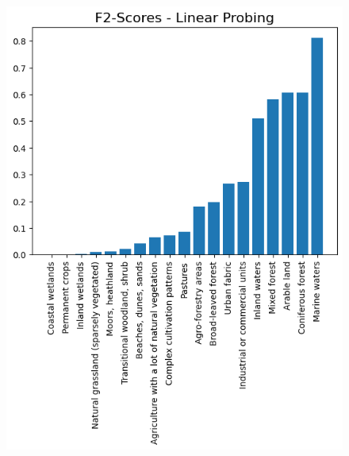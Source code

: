 \begin{figure}[h]
  \centering
  \begin{minipage}[b]{0.49\columnwidth}
    \centering
    \includegraphics[width=\columnwidth]{images/Linear Probing - f2 scores.png}
  \end{minipage}
  \begin{minipage}[b]{0.49\columnwidth}
    \centering

\end{minipage}
\end{figure}
